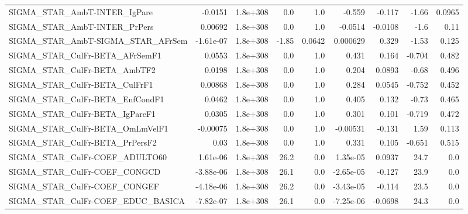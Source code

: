 \begin{tabular}{lrrrrrrrr}
SIGMA\_STAR\_AmbT-INTER\_IgPare          &     -0.0151 &     1.8e+308 &     0.0 &      1.0 &     -0.559 &      -0.117 &        -1.66 &        0.0965 \\
SIGMA\_STAR\_AmbT-INTER\_PrPers          &     0.00692 &     1.8e+308 &     0.0 &      1.0 &    -0.0514 &     -0.0108 &         -1.6 &          0.11 \\
SIGMA\_STAR\_AmbT-SIGMA\_STAR\_AFrSem     &   -1.61e-07 &     1.8e+308 &   -1.85 &   0.0642 &   0.000629 &       0.329 &        -1.53 &         0.125 \\
SIGMA\_STAR\_CulFr-BETA\_AFrSemF1        &      0.0553 &     1.8e+308 &     0.0 &      1.0 &      0.431 &       0.164 &       -0.704 &         0.482 \\
SIGMA\_STAR\_CulFr-BETA\_AmbTF2          &      0.0198 &     1.8e+308 &     0.0 &      1.0 &      0.204 &      0.0893 &        -0.68 &         0.496 \\
SIGMA\_STAR\_CulFr-BETA\_CulFrF1         &     0.00868 &     1.8e+308 &     0.0 &      1.0 &      0.284 &      0.0545 &       -0.752 &         0.452 \\
SIGMA\_STAR\_CulFr-BETA\_EnfCondF1       &      0.0462 &     1.8e+308 &     0.0 &      1.0 &      0.405 &       0.132 &        -0.73 &         0.465 \\
SIGMA\_STAR\_CulFr-BETA\_IgPareF1        &      0.0305 &     1.8e+308 &     0.0 &      1.0 &      0.301 &       0.101 &       -0.719 &         0.472 \\
SIGMA\_STAR\_CulFr-BETA\_OmLmVelF1       &    -0.00075 &     1.8e+308 &     0.0 &      1.0 &   -0.00531 &      -0.131 &         1.59 &         0.113 \\
SIGMA\_STAR\_CulFr-BETA\_PrPersF2        &        0.03 &     1.8e+308 &     0.0 &      1.0 &      0.331 &       0.105 &       -0.651 &         0.515 \\
SIGMA\_STAR\_CulFr-COEF\_ADULTO60        &    1.61e-06 &     1.8e+308 &    26.2 &      0.0 &   1.35e-05 &      0.0937 &         24.7 &           0.0 \\
SIGMA\_STAR\_CulFr-COEF\_CONGCD          &   -3.88e-06 &     1.8e+308 &    26.1 &      0.0 &  -2.65e-05 &      -0.127 &         23.9 &           0.0 \\
SIGMA\_STAR\_CulFr-COEF\_CONGEF          &   -4.18e-06 &     1.8e+308 &    26.2 &      0.0 &  -3.43e-05 &      -0.114 &         23.5 &           0.0 \\
SIGMA\_STAR\_CulFr-COEF\_EDUC\_BASICA     &   -7.82e-07 &     1.8e+308 &    26.1 &      0.0 &  -7.25e-06 &     -0.0698 &         24.3 &           0.0 \\

\end{tabular}

